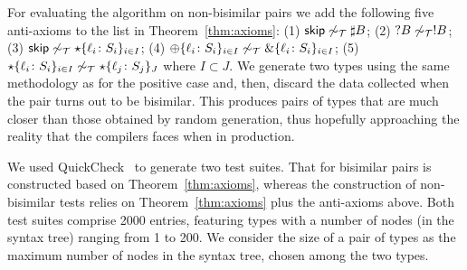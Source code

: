 For evaluating the algorithm on non-bisimilar pairs we add the 
following five anti-axioms to the list in 
Theorem~\ref{thm:axioms}:
(1) $\mathsf{skip} \not\sim_\mathcal T \sharp B$; \enspace
(2) $?B \not\sim_\mathcal T !B$; \enspace
(3) $\mathsf{skip} \not\sim_\mathcal T \star\{\ell_i\colon S_i\}_{i\in I}$; \enspace
(4) $\oplus\{\ell_i\colon S_i\}_{i\in I} \not\sim_\mathcal T \&\{\ell_i\colon S_i\}_{i\in I}$; \enspace
(5) $\star\{\ell_i\colon S_i\}_{i\in I} \not\sim_\mathcal T \star\{\ell_j\colon S_j\}_J$
where $I \subset J$.
%
We generate two types using the same methodology as for the positive
case and, then, discard the data collected when the pair turns out to
be bisimilar.
%
This produces pairs of types that are much closer than those obtained
by random generation, thus hopefully approaching the reality that the
compilers faces when in production.


We used QuickCheck~\cite{DBLP:conf/icfp/ClaessenH00} to generate two
test suites. That for bisimilar pairs is constructed based on
Theorem~\ref{thm:axioms}, whereas the construction of non-bisimilar
tests relies on Theorem~\ref{thm:axioms} plus the anti-axioms
above. Both test suites comprise 2000 entries, featuring types with a
number of nodes (in the syntax tree) ranging from 1 to 200.  We
consider the size of a pair of types as the maximum number of nodes in
the syntax tree, chosen among the two types.

